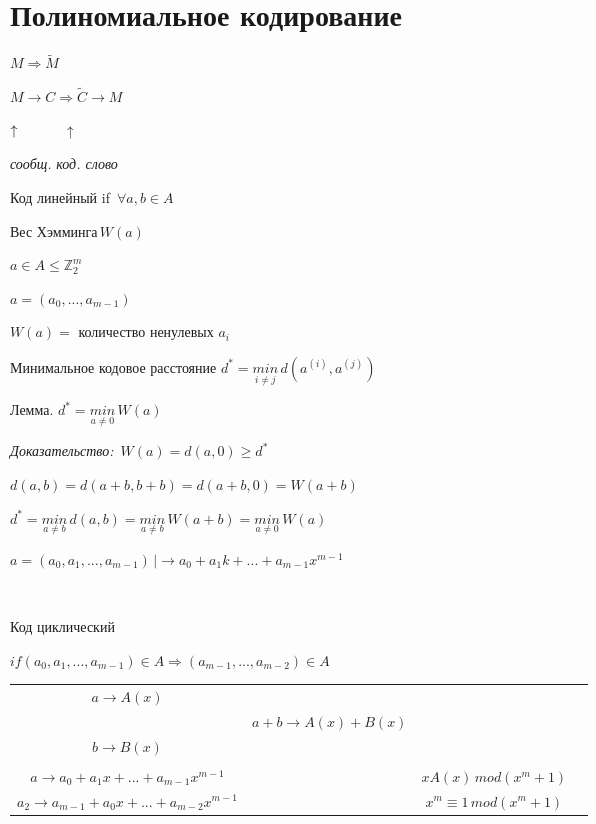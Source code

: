 \documentclass[12pt]{article}
\begin{document}
    \section{Полиномиальное кодирование}
    $M \Rightarrow \widetilde{M}$\par
    $M \to C \Rightarrow \widetilde{C} \to M$\par
    $\uparrow \hspace{1 cm}$ $\uparrow$\par
    \textit{сообщ.} \textit{код. слово}\par
    Код линейный if $\, \forall a,b \in A$\par
    Вес Хэмминга$\, W(a)$\par
    $a \in A \leq \mathbb{Z}_2^m$\par
    $a = (a_0,...,a_{m-1})$\par
    $W(a) =$ количество ненулевых $a_i$\par
    Минимальное кодовое расстояние $d^* = \overset{}{\underset{i \neq j}{min}} \, d(a^{(i)},a^{(j)})$\par
    Лемма. $d^* = \overset{}{\underset{a \neq 0}{min}} \, W(a)$\par
    \textit{Доказательство:} $\, W(a) = d(a,0) \geq d^*$\par
    $d(a,b) = d(a+b,b+b) = d(a+b, 0) = W(a+b)$\par
    $d^* = \overset{}{\underset{a \neq b}{min}} \, d(a,b) = \overset{}{\underset{a \neq b}{min}} \, W(a+b) = \overset{}{\underset{a \neq 0}{min} \, W(a)}$\par
    $a = (a_0, a_1, ..., a_{m-1}) \, |\to a_0+a_1k+...+a_{m-1}x^{m-1}$\par
    $ $\par
    Код циклический\par
    $if (a_0,a_1,...,a_{m-1}) \in A \Rightarrow (a_{m-1},...,a_{m-2}) \in A$\par
    \begin{tabular}{cccc}
        $a \to A(x)$ \\
         &  $a+b \to A(x) + B(x)$\\
        $b \to B(x)$ \\
        \\
        $a \to a_0 +a_1 x +...+ a_{m-1}x^{m-1}$ & & $xA(x) \, mod(x^m + 1)$\\
        $a_2 \to a_{m-1} + a_0 x + ... + a_{m-2}x^{m-1}$ & & $x^m \equiv 1 \, mod(x^m +1)$\\
    \end{tabular}\par
\end{document}
